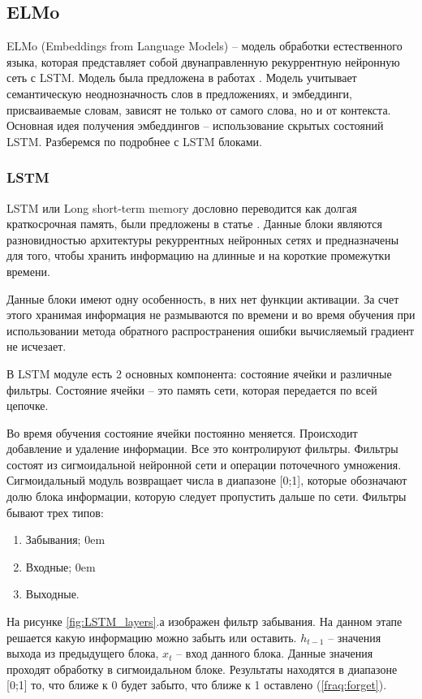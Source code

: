 \documentclass[a4paper,14pt]{article}
\begin{document}
\subsection{ELMo}

ELMo (Embeddings from Language Models) -- модель обработки естественного языка, которая представляет собой двунаправленную рекуррентную нейронную сеть с LSTM.
Модель была предложена в работах \cite{elmo1,elmo2,elmo3}.
Модель учитывает семантическую неоднозначность слов в предложениях, и эмбеддинги, присваиваемые словам, зависят не только от самого слова, но и от контекста.
Основная идея получения эмбеддингов -- использование скрытых состояний LSTM.
Разберемся по подробнее с LSTM блоками.

\subsubsection{LSTM}

LSTM или Long short-term memory дословно переводится как долгая краткосрочная память, были предложены в статье \cite{lstm}.
Данные блоки являются разновидностью архитектуры рекуррентных нейронных сетях и предназначены для того, чтобы хранить информацию на длинные и на короткие промежутки времени.

Данные блоки имеют одну особенность, в них нет функции активации.
За счет этого хранимая информация не размываются по времени и во время обучения при использовании метода обратного распространения ошибки вычисляемый градиент не исчезает.

В LSTM модуле есть 2 основных компонента: состояние ячейки и различные фильтры.
Состояние ячейки -- это память сети, которая передается по всей цепочке.

Во время обучения состояние ячейки постоянно меняется. Происходит добавление и удаление информации.
Все это контролируют фильтры.
Фильтры состоят из сигмоидальной нейронной сети и операции поточечного умножения.
Сигмоидальный модуль возвращает числа в диапазоне [0;1], которые обозначают долю блока информации, которую следует пропустить дальше по сети.
Фильтры бывают трех типов:
\begin{enumerate}
	\itemsep0em 
	\item Забывания;
	\itemsep0em 
	\item Входные;
	\itemsep0em 
	\item Выходные.
\end{enumerate}

На рисунке \ref{fig:LSTM_layers}.а изображен фильтр забывания.
На данном этапе решается какую информацию можно забыть или оставить.
$h_{t-1}$ -- значения выхода из предыдущего блока, $x_t$ -- вход данного блока.
Данные значения проходят обработку в сигмоидальном блоке.
Результаты находятся в диапазоне [0;1] то, что ближе к 0 будет забыто, что ближе к 1 оставлено (\ref{fraq:forget}).
\end{document}
